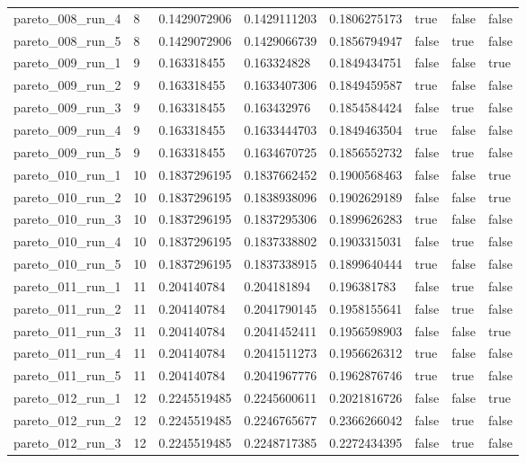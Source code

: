 \begin{tabular}{@{}llllllll@{}}
pareto\_008\_run\_4 & 8 & 0.1429072906 & 0.1429111203 & 0.1806275173 & true & false & false \\
pareto\_008\_run\_5 & 8 & 0.1429072906 & 0.1429066739 & 0.1856794947 & false & true & false \\
pareto\_009\_run\_1 & 9 & 0.163318455 & 0.163324828 & 0.1849434751 & false & false & true \\
pareto\_009\_run\_2 & 9 & 0.163318455 & 0.1633407306 & 0.1849459587 & true & false & false \\
pareto\_009\_run\_3 & 9 & 0.163318455 & 0.163432976 & 0.1854584424 & false & true & false \\
pareto\_009\_run\_4 & 9 & 0.163318455 & 0.1633444703 & 0.1849463504 & true & false & false \\
pareto\_009\_run\_5 & 9 & 0.163318455 & 0.1634670725 & 0.1856552732 & false & true & false \\
pareto\_010\_run\_1 & 10 & 0.1837296195 & 0.1837662452 & 0.1900568463 & false & false & true \\
pareto\_010\_run\_2 & 10 & 0.1837296195 & 0.1838938096 & 0.1902629189 & false & false & true \\
pareto\_010\_run\_3 & 10 & 0.1837296195 & 0.1837295306 & 0.1899626283 & true & false & false \\
pareto\_010\_run\_4 & 10 & 0.1837296195 & 0.1837338802 & 0.1903315031 & false & true & false \\
pareto\_010\_run\_5 & 10 & 0.1837296195 & 0.1837338915 & 0.1899640444 & true & false & false \\
pareto\_011\_run\_1 & 11 & 0.204140784 & 0.204181894 & 0.196381783 & false & true & false \\
pareto\_011\_run\_2 & 11 & 0.204140784 & 0.2041790145 & 0.1958155641 & false & true & false \\
pareto\_011\_run\_3 & 11 & 0.204140784 & 0.2041452411 & 0.1956598903 & false & false & true \\
pareto\_011\_run\_4 & 11 & 0.204140784 & 0.2041511273 & 0.1956626312 & true & false & false \\
pareto\_011\_run\_5 & 11 & 0.204140784 & 0.2041967776 & 0.1962876746 & true & true & false \\
pareto\_012\_run\_1 & 12 & 0.2245519485 & 0.2245600611 & 0.2021816726 & false & false & true \\
pareto\_012\_run\_2 & 12 & 0.2245519485 & 0.2246765677 & 0.2366266042 & false & true & false \\
pareto\_012\_run\_3 & 12 & 0.2245519485 & 0.2248717385 & 0.2272434395 & false & true & false \\

\end{tabular}
